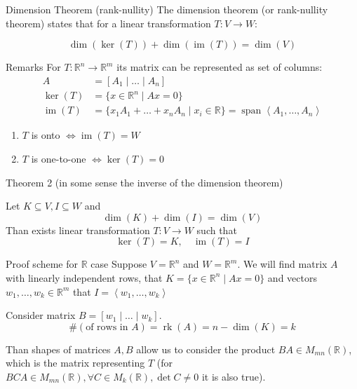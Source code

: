 \documentclass[fullscreen=true, bookmarks=true, hyperref={pdfencoding=unicode}]{beamer}
\begin{document}
\begin{frame}
  \begin{block}{Dimension Theorem (rank-nullity)}
    The dimension theorem (or rank-nullity theorem) states that for a linear transformation $T: V \rightarrow W$:
    
    \[
    \operatorname{dim}(\operatorname{ker}(T)) + \operatorname{dim}(\operatorname{im}(T)) = \operatorname{dim}(V)
    \]
  \end{block}

  \begin{block}{Remarks}
    For $T: \mathbb{R}^n \rightarrow \mathbb{R}^m$ its matrix can be represented as set of columns:
    \begin{align*}
      A &= [A_1\mid \dots \mid A_n] \\
      \operatorname{ker}(T) &= \{x \in \mathbb{R}^n \mid Ax = 0 \} \\
      \operatorname{im}(T) &= \{x_1A_1 + \dots + x_nA_n \mid x_i \in \mathbb{R}\} = \operatorname{span}\left<A_1, \dots, A_n \right>
    \end{align*}
    \begin{enumerate}
      \item $T$ is onto $\Leftrightarrow \operatorname{im}(T) = W$
      \item $T$ is one-to-one $\Leftrightarrow \operatorname{ker}(T) = 0$
    \end{enumerate}
  \end{block}
\end{frame}


\begin{frame}{Theorem 2}
  (in some sense the inverse of the dimension theorem)
  
  Let $K \subseteq V, I \subseteq W$ and $$ \operatorname{dim}(K) + \operatorname{dim}(I) = \operatorname{dim}(V)$$
  Than exists linear transformation $T: V \rightarrow W$ such that
  $$ \operatorname{ker}(T) = K, \quad \operatorname{im}(T) = I$$
  
  \begin{block}{Proof scheme for $\mathbb{R}$ case}
    \small
    \pause
    Suppose $V = \mathbb{R}^n$ and $W = \mathbb{R}^m$.
    We will find matrix $A$ with linearly independent rows, 
    that $K = \{x \in \mathbb{R}^n \mid Ax = 0\}$ and vectors 
    $w_1, \dots, w_k \in \mathbb{R}^m$ that $I = \left<w_1, \dots, w_k \right>$

    \pause
    Consider matrix $B = [w_1\mid \dots \mid w_k]$. 
    $$ \#(\text{of rows in } A) = \operatorname{rk}(A) = n - \operatorname{dim}(K) = k$$
    
    Than shapes of matrices $A, B$ allow us to consider the 
    product $BA \in M_{mn}(\mathbb{R})$, which is the matrix representing $T$
    (for $BCA \in M_{mn}(\mathbb{R}), \forall C \in M_{k}(\mathbb{R}), \det C \neq 0$ it is also true).
  \end{block}
\end{frame}
\end{document}
